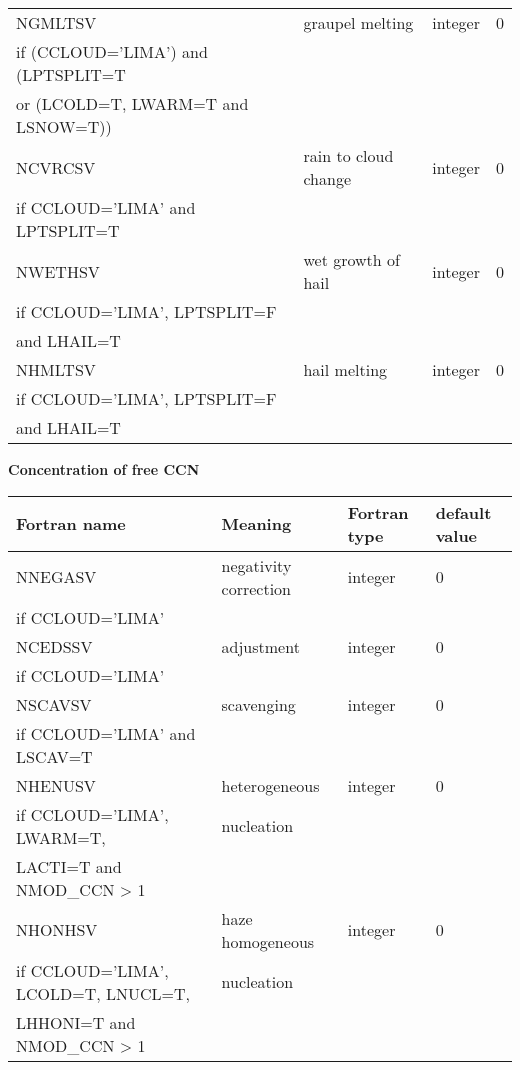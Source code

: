 \begin{longtable} {|p{}|p{}|>{\centering}p{}|p{}<{\centering}|}
NGMLTSV & graupel melting& integer & 0 \\ \nopagebreak
if (CCLOUD='LIMA') and (LPTSPLIT=T &&& \\ \nopagebreak
or (LCOLD=T, LWARM=T and LSNOW=T))&&& \\\hline

NCVRCSV & rain to cloud change & integer & 0 \\ \nopagebreak
if CCLOUD='LIMA' and LPTSPLIT=T &&& \\\hline

NWETHSV & wet growth of hail& integer & 0 \\ \nopagebreak
if CCLOUD='LIMA', LPTSPLIT=F &&& \\ \nopagebreak
and LHAIL=T &&& \\\hline

NHMLTSV & hail melting & integer & 0 \\ \nopagebreak
if CCLOUD='LIMA', LPTSPLIT=F &&& \\ \nopagebreak
and LHAIL=T &&& \\\hline
\end{longtable}

\textbf{Concentration of free CCN}
\begin{longtable} {|p{}|p{}|>{\centering}p{}|p{}<{\centering}|}
\hline
Fortran name & Meaning & Fortran type & default value \\
\hline \hline
\endhead
NNEGASV & negativity correction& integer & 0 \\ \nopagebreak
if CCLOUD='LIMA' &&& \\\hline

NCEDSSV & adjustment & integer & 0 \\ \nopagebreak
if CCLOUD='LIMA' &&& \\\hline

NSCAVSV & scavenging & integer & 0 \\ \nopagebreak
if CCLOUD='LIMA' and LSCAV=T &&& \\\hline

NHENUSV & heterogeneous  & integer & 0 \\ \nopagebreak
if CCLOUD='LIMA', LWARM=T, &nucleation && \\ \nopagebreak
LACTI=T and NMOD\_CCN > 1 &&& \\\hline

NHONHSV & haze homogeneous  & integer & 0 \\ \nopagebreak
if CCLOUD='LIMA', LCOLD=T, LNUCL=T, & nucleation&& \\ \nopagebreak
LHHONI=T and NMOD\_CCN > 1 &&& \\\hline
\end{longtable}

